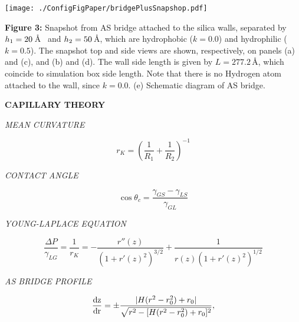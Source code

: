 \documentclass[a0,portrait,16pt]{a0poster}
\begin{document}
{{\begin{center}
			\texttt{[image: ./ConfigFigPaper/bridgePlusSnapshop.pdf]}
\end{center}
\small{\textbf{Figure 3:}
Snapshot from AS bridge attached to the silica walls, separated by $h_{\rm 1} = 20$\,\AA~ and $h_{\rm 2} = 50$\,\AA, which are hydrophobic ($k=0.0$)  and hydrophilic ($k=0.5$). The snapshot top and side views are shown, respectively, on panels (a) and (c), and (b) and (d). The wall side length is given by $L=277.2$\,\AA, which coincide to simulation box side length. Note that there is no Hydrogen atom attached to the wall, since $k=0.0$. (e) Schematic diagram of AS bridge.}


\vspace{1.65cm}
\begin{center}
	\textsf{\LARGE{\textbf{\textcolor[RGB]{77,134,66}{CAPILLARY THEORY}}}}
\end{center}

\vspace{0.75cm}
\begin{minipage}{0.495\textwidth}
	\begin{center}
		\textsf{\large{\textit{\textcolor[RGB]{77,134,66}{MEAN CURVATURE}}}}
	\end{center}
	$$r_K = \left ( \frac{1}{R_1} + \frac{1}{R_2} \right )^{-1}$$ 
\end{minipage}
\begin{minipage}{0.495\textwidth}
	\begin{center}
		\textsf{\large{\textit{\textcolor[RGB]{77,134,66}{CONTACT ANGLE}}}}
	\end{center}
	$$\cos \theta_c = \frac{ \gamma_{GS} - \gamma_{LS}}{\gamma_{GL}}$$
\end{minipage}

\vspace{0.75cm}
\begin{center}
	\textsf{\large{\textit{\textcolor[RGB]{77,134,66}{YOUNG-LAPLACE EQUATION}}}}
\end{center}
\begin{equation}
\frac{\Delta P}{\gamma_{LG}} = \frac{1}{r_K}=-\frac{r{}''(z)}{(1+r{}'(z)^2)^{3/2}}+\frac{1}{r(z)(1+r{}'(z)^2)^{1/2}}
\end{equation}

\vspace{0.75cm}
\begin{center}
	\textsf{\large{\textit{\textcolor[RGB]{77,134,66}{AS BRIDGE PROFILE}}}}
\end{center}
\begin{equation}
\frac{\rm{d}z}{\rm{d}r} = \pm\frac{|H(r^2 - r_0^2) + r_0 |}{\sqrt{r^2 - [H(r^2 - r_0^2) + r_0]^2}},
\end{equation}

}}
\end{document}
